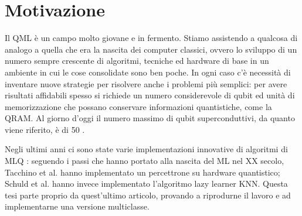 
\section{Motivazione}

Il \ac{QML} è un campo molto giovane e in fermento. Stiamo assistendo a qualcosa di 
analogo a quella che era la nascita dei computer classici, ovvero lo sviluppo di un 
numero sempre crescente di algoritmi, tecniche ed hardware di base in 
un ambiente in cui le cose consolidate sono ben poche.  
In ogni caso c'è necessità di inventare nuove strategie per risolvere anche i 
problemi più semplici: per avere risultati affidabili spesso si richiede un 
numero considerevole di qubit ed unità di memorizzazione che possano conservare 
informazioni quantistiche, come la \ac{QRAM}. 
Al giorno d'oggi il numero massimo di qubit superconduttivi, da quanto viene 
riferito, è di 50 \cite{50qubit}. 

Negli ultimi anni ci sono state varie implementazioni innovative di algoritmi di \ac{MLQ} \cite{quantum-advantage}: 
seguendo i passi che hanno portato alla nascita del \ac{ML} nel XX secolo, 
Tacchino et al. \cite{tacchino} hanno implementato un percettrone su hardware quantistico;
Schuld et al. \cite{schuld} hanno invece implementato l'algoritmo lazy learner \ac{KNN}. 
Questa tesi parte proprio da quest'ultimo articolo, provando a riprodurne il lavoro e ad 
implementarne una versione multiclasse. 


